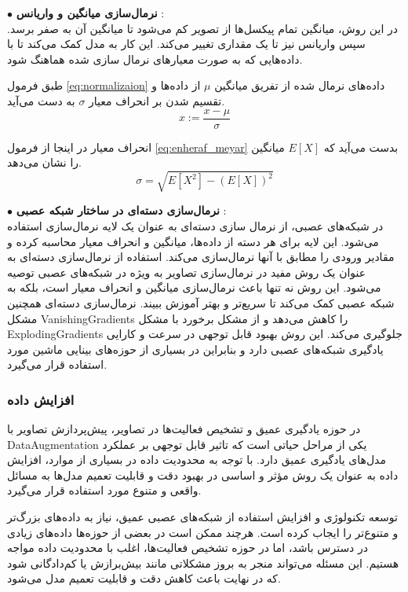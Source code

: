 $\bullet$ \textbf{نرمال‌سازی میانگین و واریانس}
:\\
در این روش، میانگین تمام پیکسل‌ها از تصویر کم می‌شود تا میانگین آن به صفر برسد. سپس واریانس نیز تا یک مقداری تغییر می‌کند. این کار به مدل کمک می‌کند تا با داده‌هایی که به صورت معیارهای نرمال سازی شده هماهنگ شود.

طبق فرمول 
 \ref{eq:normalizaion}
داده‌های نرمال‌ شده از تفریق میانگین %
$\mu$
 از داده‌ها و تقسیم شدن بر انحراف معیار %
 $\sigma$ 
 به دست می‌آید.
\begin{equation}
	\label{eq:normalizaion}
	x:=\frac{x-\mu}{\sigma}
\end{equation}

انحراف معیار در اینجا از فرمول %
\ref{eq:enheraf_meyar}
 بدست می‌آید که %
 $E[X]$
  میانگین را نشان می‌دهد.
  \begin{equation}
  	\label{eq:enheraf_meyar}
  	  \sigma=\sqrt{E\left[X^2\right]-(E[X])^2}
  \end{equation}
  
$\bullet$ \textbf{نرمال‌سازی دسته‌ای در ساختار شبکه عصبی}
:\\
در شبکه‌های عصبی، از نرمال سازی دسته‌ای به عنوان یک لایه نرمال‌سازی استفاده می‌شود. این لایه برای هر دسته از داده‌ها، میانگین و انحراف معیار محاسبه کرده و مقادیر ورودی را مطابق با آنها نرمال‌سازی می‌کند. 
استفاده از نرمال‌سازی دسته‌ای به عنوان یک روش مفید در نرمال‌سازی تصاویر به ویژه در شبکه‌های عصبی توصیه می‌شود. این روش نه تنها باعث نرمال‌سازی میانگین و انحراف معیار است، بلکه به شبکه عصبی کمک می‌کند تا سریع‌تر و بهتر آموزش ببیند. نرمال‌سازی دسته‌ای همچنین مشکل %
\gls{VanishingGradients}
 را کاهش می‌دهد و از مشکل برخورد با مشکل %
\gls{ExplodingGradients}
 جلوگیری می‌کند. این روش بهبود قابل توجهی در سرعت و کارایی یادگیری شبکه‌های عصبی دارد و بنابراین در بسیاری از حوزه‌های بینایی ماشین مورد استفاده قرار می‌گیرد.
 
  \subsubsection{افزایش داده}
 در حوزه یادگیری عمیق و تشخیص فعالیت‌ها در تصاویر، پیش‌پردازش تصاویر با %
 \gls{DataAugmentation}
 یکی از مراحل حیاتی است که تاثیر قابل توجهی بر عملکرد مدل‌های یادگیری عمیق دارد. با توجه به محدودیت داده در بسیاری از موارد، افزایش داده به عنوان یک روش مؤثر و اساسی در بهبود دقت و قابلیت تعمیم مدل‌ها به مسائل واقعی و متنوع مورد استفاده قرار می‌گیرد.
 
 توسعه تکنولوژی و افزایش استفاده از شبکه‌های عصبی عمیق، نیاز به داده‌های بزرگ‌تر و متنوع‌تر را ایجاب کرده است. هرچند ممکن است در بعضی از حوزه‌ها داده‌های زیادی در دسترس باشد، اما در حوزه تشخیص فعالیت‌ها، اغلب با محدودیت داده مواجه هستیم. این مسئله می‌تواند منجر به بروز مشکلاتی مانند بیش‌برازش یا کم‌دادگانی شود که در نهایت باعث کاهش دقت و قابلیت تعمیم مدل می‌شود.

